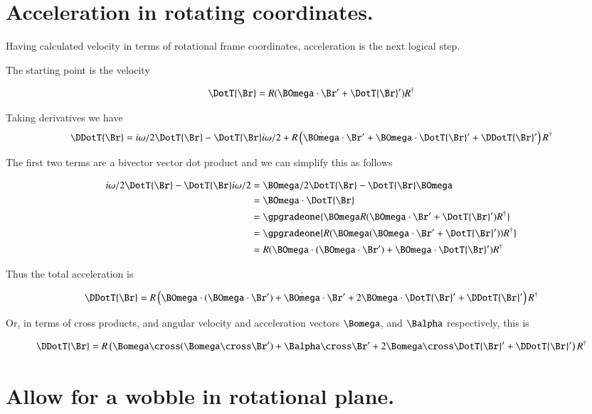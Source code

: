 \section{Acceleration in rotating coordinates. }

Having calculated velocity in terms of rotational frame coordinates, acceleration is the next
logical step.

The starting point is the velocity

\[
\DotT{\Br} = R ( \BOmega \cdot \Br' + \DotT{\Br}' ) R^\dagger
\]

Taking derivatives we have
\[
\DDotT{\Br} = i \omega /2 \DotT{\Br} - \DotT{\Br} i \omega /2 + R \left( \dot{\BOmega} \cdot \Br' + \BOmega \cdot \DotT{\Br}' + \DDotT{\Br}' \right) R^\dagger
\]

The first two terms are a bivector vector dot product and we can simplify this as follows

\begin{align*}
i \omega /2 \DotT{\Br} - \DotT{\Br} i \omega /2
&= \BOmega /2 \DotT{\Br} - \DotT{\Br} \BOmega \\
&= \BOmega \cdot \DotT{\Br} \\
&= \gpgradeone{ \BOmega R ( \BOmega \cdot \Br' + \DotT{\Br}' ) R^\dagger } \\
&= \gpgradeone{ R ( \BOmega (\BOmega \cdot \Br' + \DotT{\Br}') ) R^\dagger } \\
&= R ( \BOmega \cdot (\BOmega \cdot \Br') + \BOmega \cdot \DotT{\Br}') R^\dagger \\
\end{align*}

Thus the total acceleration is

\begin{equation}
\DDotT{\Br} = R \left( \BOmega \cdot (\BOmega \cdot \Br') +\dot{\BOmega} \cdot \Br' + 2 \BOmega \cdot \DotT{\Br}' + \DDotT{\Br}' \right) R^\dagger
\end{equation}

Or, in terms of cross products, and angular velocity and acceleration vectors $\Bomega$, and $\Balpha$ respectively, this is

\begin{equation}\label{eqn:keRot:accelerationfixedrotplane}
\DDotT{\Br} = R \left( \Bomega \cross (\Bomega \cross \Br') + \Balpha \cross \Br' + 2 \Bomega \cross \DotT{\Br}' + \DDotT{\Br}' \right) R^\dagger
\end{equation}

\section{Allow for a wobble in rotational plane. }

